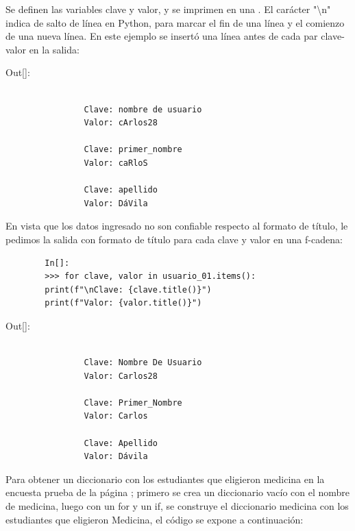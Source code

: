 	
	Se definen las variables clave y valor,  y se  imprimen en una {}. El carácter  {\ttfamily "{}\textbackslash n{}"{}} indica de salto de línea en Python, para marcar el fin de una línea y el comienzo de una nueva línea.  En este ejemplo se insertó una línea antes de cada par clave-valor en la salida:
	
	{\ttfamily\scriptsize\scriptsize 
		\hspace{-0.65cm}Out[]: \vspace{-0.3cm}	
		{\color{blue} 	
			\begin{verbatim}
				
				Clave: nombre de usuario
				Valor: cArlos28
				
				Clave: primer_nombre
				Valor: caRloS
				
				Clave: apellido
				Valor: DáVila	
			\end{verbatim}
	}}
	
	En vista que los datos ingresado no son confiable respecto al formato de título, le pedimos la salida con
	formato de título para cada clave y valor en una {\ttfamily f-cadena}:  
	
	\begin{lstlisting}
		In[]:  
		>>> for clave, valor in usuario_01.items():
		print(f"\nClave: {clave.title()}")
		print(f"Valor: {valor.title()}")
	\end{lstlisting}
	{\ttfamily\scriptsize\scriptsize 
		\hspace{-0.15cm}Out[]: \vspace{-0.3cm}	
		{\color{blue} 	
			\begin{verbatim}
				
				Clave: Nombre De Usuario
				Valor: Carlos28
				
				Clave: Primer_Nombre
				Valor: Carlos
				
				Clave: Apellido
				Valor: Dávila
			\end{verbatim}
	}}
	
	
	Para obtener un diccionario con los estudiantes que eligieron medicina en la {\ttfamily encuesta} prueba de la página \pageref{encuesta}; primero se crea un diccionario vacío con el nombre de {\ttfamily medicina}, luego con un {\ttfamily for} y un {\ttfamily if}, se construye el diccionario {\ttfamily medicina}  con los estudiantes que eligieron  Medicina,  el código se expone a continuación:
	
